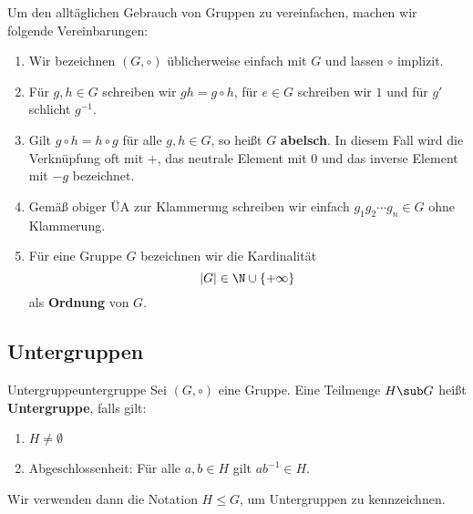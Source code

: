 \begin{bemerkung}
Um den alltäglichen Gebrauch von Gruppen zu vereinfachen, machen wir folgende Vereinbarungen:
\begin{enumerate}
\item Wir bezeichnen $(G, \circ)$ üblicherweise einfach mit $G$ und lassen $\circ$ implizit.
\item Für $g,h \in G$ schreiben wir $gh = g \circ h$, für $e \in G$ schreiben wir $1$ und für $g'$ schlicht $g^{-1}$.
\item Gilt $g \circ h = h \circ g$ für alle $g,h \in G$, so heißt $G$ \textbf{abelsch}. In diesem Fall wird die Verknüpfung oft mit $+$, das neutrale Element mit $0$ und das inverse Element mit $-g$ bezeichnet.
\item Gemäß obiger ÜA zur Klammerung schreiben wir einfach $g_1 g_2 \cdots g_n \in G$ ohne Klammerung.
\item Für eine Gruppe $G$ bezeichnen wir die Kardinalität \begin{equation}
|G| \in \N \cup \{+\infty \}
\end{equation}
als \textbf{Ordnung} von $G$.
\end{enumerate}
\end{bemerkung}

\subsection{Untergruppen}
\label{subsec:untergruppen}
\begin{definition}{Untergruppe}{untergruppe}
Sei $(G, \circ)$ eine Gruppe. Eine Teilmenge $H \sub G$ heißt \textbf{Untergruppe}, falls gilt:
\begin{enumerate}
\item $H \neq \emptyset$
\item Abgeschlossenheit: Für alle $a, b \in H$ gilt $ab^{-1} \in H$.
\end{enumerate}
Wir verwenden dann die Notation $H \leq G$, um Untergruppen zu kennzeichnen.
\end{definition}

